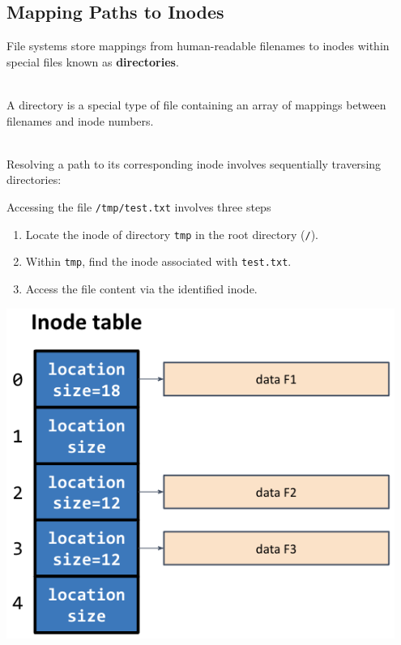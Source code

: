 \subsection{Mapping Paths to Inodes}
File systems store mappings from human-readable filenames to inodes within special files known as \textbf{directories}.\\[3px]

\begin{definition}[Directory]\leavevmode \\[5px]
A directory is a special type of file containing an array of mappings between filenames and inode numbers.
\end{definition}


\begin{example}
\leavevmode
\\[5px]
Resolving a path to its corresponding inode involves sequentially traversing directories:\\
\noindent
\begin{minipage}{0.45\textwidth}
Accessing the file \texttt{/tmp/test.txt} involves three steps
\begin{enumerate}
    \item Locate the inode of directory \texttt{tmp} in the root directory (\texttt{/}).
    \item Within \texttt{tmp}, find the inode associated with \texttt{test.txt}.
    \item Access the file content via the identified inode.
\end{enumerate}
\end{minipage}%
\hfill
\vline
\hfill
\begin{minipage}{0.45\textwidth}
\begin{center}
  \includegraphics[width=0.95\textwidth]{chapters/L6/images/inode-table.png}
\end{center}
\end{minipage}
\end{example}

